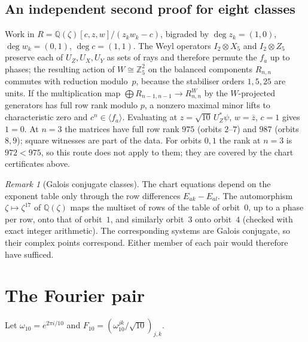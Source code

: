 \documentclass[11pt]{article}
\theoremstyle{definition}
\theoremstyle{remark}
\newtheorem{remark}[lemma]{Remark}
\newcommand{\Q}{\mathbb{Q}}
\newcommand{\Z}{\mathbb{Z}}
\begin{document}
\subsection{An independent second proof for eight classes}\label{sec:rank}
Work in $R=\Q(\zeta)[c,z,w]/(z_kw_k-c)$, bigraded by $\deg z_k=(1,0)$, $\deg w_k=(0,1)$, $\deg c=(1,1)$. The Weyl
operators $I_2\otimes X_5$ and $I_2\otimes Z_5$ preserve each of $U_Z,U_X,U_Y$ as sets of rays and therefore permute the
$f_a$ up to phases; the resulting action of $W\cong\Z_5^2$ on the balanced components $R_{n,n}$ commutes with
reduction modulo~$p$, because the stabiliser orders $1,5,25$ are units. If the multiplication map
$\bigoplus R_{n-1,n-1}\to R_{n,n}^W$ by the $W$-projected generators has full row rank modulo $p$, a nonzero maximal
minor lifts to characteristic zero and $c^n\in\langle f_a\rangle$. Evaluating at $z=\sqrt{10}\,U_Z^*\psi$,
$w=\overline z$, $c=1$ gives $1=0$. At $n=3$ the matrices have full row rank $975$ (orbits $2$--$7$) and $987$
(orbits $8,9$); square witnesses are part of the data. For orbits $0,1$ the rank at $n=3$ is $972<975$, so this route
does not apply to them; they are covered by the chart certificates above.

\begin{remark}[Galois conjugate classes]
The chart equations depend on the exponent table only through the row differences $E_{ak}-E_{al}$. The automorphism
$\zeta\mapsto\zeta^{17}$ of $\Q(\zeta)$ maps the multiset of rows of the table of orbit~$0$, up to a phase per row, onto
that of orbit~$1$, and similarly orbit~$3$ onto orbit~$4$ (checked with exact integer arithmetic). The corresponding
systems are Galois conjugate, so their complex points correspond. Either member of each pair would therefore have
sufficed.
\end{remark}

\section{The Fourier pair}\label{sec:B}

Let $\omega_{10}=e^{2\pi i/10}$ and $F_{10}=(\omega_{10}^{jk}/\sqrt{10})_{j,k}$.
\end{document}

